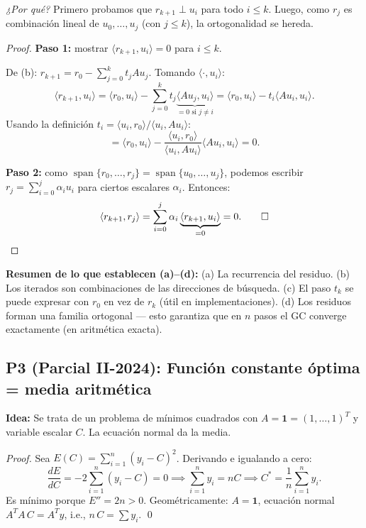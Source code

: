 \documentclass[11pt,a4paper]{article}
\begin{document}
\textit{¿Por qué?} Primero probamos que $r_{k+1}\perp u_i$ para todo $i\le k$. Luego, como $r_j$ es combinación lineal de $u_0,\ldots,u_j$ (con $j\le k$), la ortogonalidad se hereda.

\begin{proof}
\textbf{Paso 1:} mostrar $\langle r_{k+1},u_i\rangle=0$ para $i\le k$.

De (b): $r_{k+1}=r_0-\sum_{j=0}^kt_jAu_j$. Tomando $\langle\cdot,u_i\rangle$:
\[
  \langle r_{k+1},u_i\rangle
  = \langle r_0,u_i\rangle - \sum_{j=0}^k t_j\underbrace{\langle Au_j,u_i\rangle}_{=0\text{ si }j\ne i}
  = \langle r_0,u_i\rangle - t_i\langle Au_i,u_i\rangle.
\]
Usando la definición $t_i=\langle u_i,r_0\rangle/\langle u_i,Au_i\rangle$:
\[
  = \langle r_0,u_i\rangle - \frac{\langle u_i,r_0\rangle}{\langle u_i,Au_i\rangle}\langle Au_i,u_i\rangle = 0.
\]

\textbf{Paso 2:} como $\operatorname{span}\{r_0,\ldots,r_j\}=\operatorname{span}\{u_0,\ldots,u_j\}$, podemos escribir $r_j=\sum_{i=0}^j\alpha_iu_i$ para ciertos escalares $\alpha_i$. Entonces:
\[
  \langle r_{k+1},r_j\rangle = \sum_{i=0}^j\alpha_i\underbrace{\langle r_{k+1},u_i\rangle}_{=0}=0. \qed
\]
\end{proof}

\begin{tcolorbox}[clave]
\textbf{Resumen de lo que establecen (a)--(d):} (a) La recurrencia del residuo. (b) Los iterados son combinaciones de las direcciones de búsqueda. (c) El paso $t_k$ se puede expresar con $r_0$ en vez de $r_k$ (útil en implementaciones). (d) Los residuos forman una familia ortogonal --- esto garantiza que en $n$ pasos el GC converge exactamente (en aritmética exacta).
\end{tcolorbox}

\subsection{P3 (Parcial II-2024): Función constante óptima = media aritmética}

\textbf{Idea:} Se trata de un problema de mínimos cuadrados con $A=\mathbf{1}=(1,\ldots,1)^T$ y variable escalar $C$. La ecuación normal da la media.

\begin{proof}
Sea $E(C)=\sum_{i=1}^n(y_i-C)^2$. Derivando e igualando a cero:
\[
  \frac{dE}{dC} = -2\sum_{i=1}^n(y_i-C) = 0
  \implies \sum_{i=1}^n y_i = nC
  \implies C^* = \frac{1}{n}\sum_{i=1}^n y_i.
\]
Es mínimo porque $E''=2n>0$. Geométricamente: $A=\mathbf{1}$, ecuación normal $A^TA\,C=A^Ty$, i.e., $n\,C=\sum y_i$. \qed
\end{proof}
\end{document}
